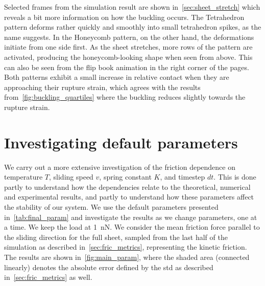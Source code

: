 Selected frames from the simulation result are shown in~\cref{sec:sheet_stretch}
which reveals a bit more information on how the buckling occurs. The Tetrahedron pattern deforms rather quickly and smoothly into small tetrahedron
spikes, as the name suggests. In the Honeycomb pattern, on the other hand, the
deformations initiate from one side first. As the sheet stretches, more rows of
the pattern are activated, producing the honeycomb-looking shape when seen from
above. This can also be seen from the flip book animation in the right corner of the pages. Both patterns exhibit a small increase in relative contact when they
are approaching their rupture strain, which agrees with the results from~\cref{fig:buckling_quartiles} where the buckling reduces slightly towards the
rupture strain.





\section{Investigating default parameters}\label{sec:main_params}
We carry out a more extensive investigation of the friction dependence on temperature $T$, sliding speed $v$, spring
constant $K$, and timestep $dt$. This is done partly to
understand how the dependencies relate to the theoretical, numerical and
experimental results, and partly to understand how these parameters affect
the stability of our system. We use the default parameters presented in~\cref{tab:final_param} and investigate the results as we change parameters, one at a time. We keep the load at \SI{1}{nN}. We consider the mean
friction force parallel to the sliding direction for the full sheet, sampled from the last half of the simulation as described in~\cref{sec:fric_metrics}, representing the kinetic friction. The results are shown in~\cref{fig:main_param}, where the shaded area (connected linearly) denotes the absolute error defined by the \acrshort{std} as described in~\cref{sec:fric_metrics} as well. 

